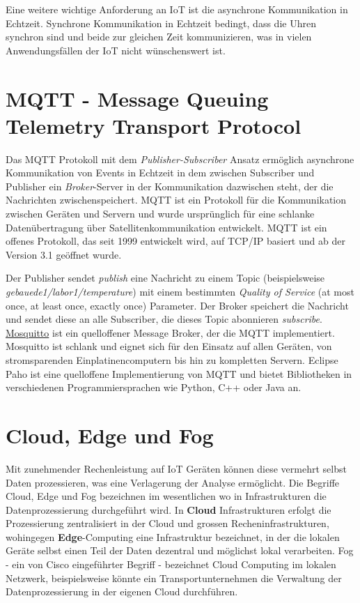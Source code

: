 \documentclass[
  11pt,
  a4paper,
  oneside, openany  ,captions=tableheading
]{scrbook}
\theoremstyle{remark}
\begin{document}
Eine weitere wichtige Anforderung an IoT ist die asynchrone
Kommunikation in Echtzeit. Synchrone Kommunikation in Echtzeit bedingt,
dass die Uhren synchron sind und beide zur gleichen Zeit kommunizieren,
was in vielen Anwendungsfällen der IoT nicht wünschenswert ist.

\section{MQTT - Message Queuing Telemetry Transport
Protocol}\label{mqtt---message-queuing-telemetry-transport-protocol}

Das MQTT Protokoll mit dem \emph{Publisher-Subscriber} Ansatz ermöglich
asynchrone Kommunikation von Events in Echtzeit in dem zwischen
Subscriber und Publisher ein \emph{Broker}-Server in der Kommunikation
dazwischen steht, der die Nachrichten zwischenspeichert. MQTT ist ein
Protokoll für die Kommunikation zwischen Geräten und Servern und wurde
ursprünglich für eine schlanke Datenübertragung über
Satellitenkommunikation entwickelt. MQTT ist ein offenes Protokoll, das
seit 1999 entwickelt wird, auf TCP/IP basiert und ab der Version 3.1
geöffnet wurde.

Der Publisher sendet \emph{publish} eine Nachricht zu einem Topic
(beispielsweise \emph{gebauede1/labor1/temperature}) mit einem
bestimmten \emph{Quality of Service} (at most once, at least once,
exactly once) Parameter. Der Broker speichert die Nachricht und sendet
diese an alle Subscriber, die dieses Topic abonnieren \emph{subscribe}.
\href{https://mosquitto.org}{Mosquitto} ist ein quelloffener Message
Broker, der die MQTT implementiert. Mosquitto ist schlank und eignet
sich für den Einsatz auf allen Geräten, von stromsparenden
Einplatinencomputern bis hin zu kompletten Servern. Eclipse Paho ist
eine quelloffene Implementierung von MQTT und bietet Bibliotheken in
verschiedenen Programmiersprachen wie Python, C++ oder Java an.

\section{Cloud, Edge und Fog}\label{cloud-edge-und-fog}

Mit zunehmender Rechenleistung auf IoT Geräten können diese vermehrt
selbst Daten prozessieren, was eine Verlagerung der Analyse ermöglicht.
Die Begriffe Cloud, Edge und Fog bezeichnen im wesentlichen wo in
Infrastrukturen die Datenprozessierung durchgeführt wird. In
\textbf{Cloud} Infrastrukturen erfolgt die Prozessierung zentralisiert
in der Cloud und grossen Recheninfrastrukturen, wohingegen
\textbf{Edge}-Computing eine Infrastruktur bezeichnet, in der die
lokalen Geräte selbst einen Teil der Daten dezentral und möglichst lokal
verarbeiten. Fog - ein von Cisco eingeführter Begriff - bezeichnet Cloud
Computing im lokalen Netzwerk, beispielsweise könnte ein
Transportunternehmen die Verwaltung der Datenprozessierung in der
eigenen Cloud durchführen.
\end{document}
